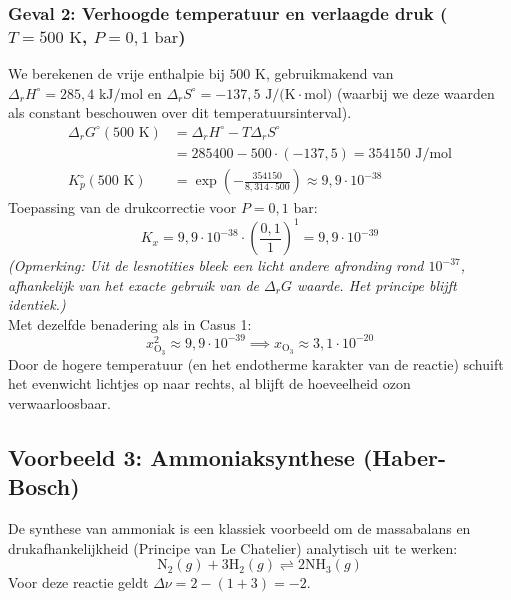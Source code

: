 \documentclass[11pt,a4paper]{article}
\begin{document}
\subsubsection{Geval 2: Verhoogde temperatuur en verlaagde druk ($T = 500\text{ K}$, $P = 0{,}1\text{ bar}$)}
We berekenen de vrije enthalpie bij $500\text{ K}$, gebruikmakend van $\Delta_r H^\circ = 285{,}4 \text{ kJ/mol}$ en $\Delta_r S^\circ = -137{,}5 \text{ J/(K}\cdot\text{mol)}$ (waarbij we deze waarden als constant beschouwen over dit temperatuursinterval).
\begin{align}
    \Delta_r G^\circ(500\text{ K}) &= \Delta_r H^\circ - T \Delta_r S^\circ \\
    &= 285400 - 500 \cdot (-137{,}5) = 354150 \text{ J/mol} \\
    K_p^\circ(500\text{ K}) &= \exp\left( -\frac{354150}{8{,}314 \cdot 500} \right) \approx 9{,}9 \cdot 10^{-38}
\end{align}
Toepassing van de drukcorrectie voor $P = 0{,}1\text{ bar}$:
\begin{equation}
    K_x = 9{,}9 \cdot 10^{-38} \cdot \left( \frac{0{,}1}{1} \right)^{1} = 9{,}9 \cdot 10^{-39}
\end{equation}
\textit{(Opmerking: Uit de lesnotities bleek een licht andere afronding rond $10^{-37}$, afhankelijk van het exacte gebruik van de $\Delta_r G$ waarde. Het principe blijft identiek.)} \\
Met dezelfde benadering als in Casus 1:
\begin{equation}
    x_{\text{O}_3}^2 \approx 9{,}9 \cdot 10^{-39} \implies x_{\text{O}_3} \approx 3{,}1 \cdot 10^{-20}
\end{equation}
Door de hogere temperatuur (en het endotherme karakter van de reactie) schuift het evenwicht lichtjes op naar rechts, al blijft de hoeveelheid ozon verwaarloosbaar.

\vspace{1cm}

\subsection{Voorbeeld 3: Ammoniaksynthese (Haber-Bosch)}
De synthese van ammoniak is een klassiek voorbeeld om de massabalans en drukafhankelijkheid (Principe van Le Chatelier) analytisch uit te werken:
\begin{equation}
    \text{N}_2(g) + 3\text{H}_2(g) \rightleftharpoons 2\text{NH}_3(g)
\end{equation}
Voor deze reactie geldt $\Delta \nu = 2 - (1 + 3) = -2$.
\end{document}

